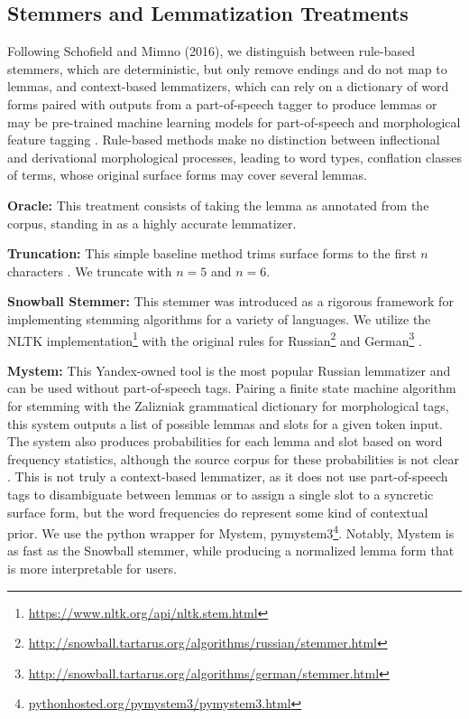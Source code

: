 \documentclass[11pt,a4paper]{article}
\begin{document}
\subsection{Stemmers and Lemmatization Treatments}
\label{sec:stemmers}
Following Schofield and Mimno (2016), we distinguish between rule-based stemmers, which are deterministic, but only remove endings and do not map to lemmas, and context-based lemmatizers, which can rely on a dictionary of word forms paired with outputs from a part-of-speech tagger to produce lemmas \cite{schofield-mimno-2016-comparing,Sharoff2011ThePP} or may be pre-trained machine learning models for part-of-speech and morphological feature tagging \cite{qi2020stanza}. Rule-based methods make no distinction between inflectional and derivational morphological processes, leading to word types, conflation classes of terms, whose original surface forms may cover several lemmas.

\textbf{Oracle:} This treatment consists of taking the lemma as annotated from the corpus, standing in as a highly accurate lemmatizer.

\textbf{Truncation:} This simple baseline method trims surface forms to the first $n$ characters \cite{schofield-mimno-2016-comparing}. We truncate with $n=5$ and $n=6$.

\textbf{Snowball Stemmer:} This stemmer was introduced as a rigorous framework for implementing stemming algorithms for a variety of languages. We utilize the NLTK implementation\footnote{\url{https://www.nltk.org/api/nltk.stem.html}} with the original rules for Russian\footnote{\url{http://snowball.tartarus.org/algorithms/russian/stemmer.html}} and German\footnote{\url{http://snowball.tartarus.org/algorithms/german/stemmer.html}} \cite{snowball}.


\textbf{Mystem:} This Yandex-owned tool is the most popular Russian lemmatizer and can be used without part-of-speech tags. Pairing a finite state machine algorithm for stemming with the Zalizniak grammatical dictionary for morphological tags, this system outputs a list of possible lemmas and slots for a given token input. The system also produces probabilities for each lemma and slot based on word frequency statistics, although the source corpus for these probabilities is not clear \cite{Segalovich2003AFM}. This is not truly a context-based lemmatizer, as it does not use part-of-speech tags to disambiguate between lemmas or to assign a single slot to a syncretic surface form, but the word frequencies do represent some kind of contextual prior. We use the python wrapper for Mystem, pymystem3\footnote{\url{pythonhosted.org/pymystem3/pymystem3.html}}. Notably, Mystem is as fast as the Snowball stemmer, while producing a normalized lemma form that is more interpretable for users.
\end{document}
